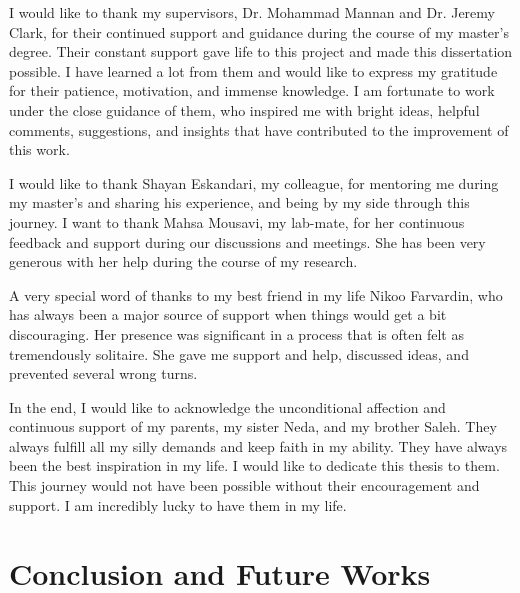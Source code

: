 \documentclass[letterpaper,12pt,onecolumn,final]{report}
\begin{document}
\begin{acknowledgments}
  I would like to thank my supervisors, Dr. Mohammad Mannan and Dr. Jeremy Clark, for their continued support and guidance during the course of my master's degree. Their constant support gave life to this project and made this dissertation possible. I have learned a lot from them and would like to express my gratitude for their patience, motivation, and immense knowledge. I am fortunate to work under the close guidance of them, who inspired me with bright ideas, helpful comments, suggestions, and insights that have contributed to the improvement of this work.

  I would like to thank Shayan Eskandari, my colleague, for mentoring me during my master's and sharing his experience, and being by my side through this journey. I want to thank Mahsa Mousavi, my lab-mate, for her continuous feedback and support during our discussions and meetings. She has been very generous with her help during the course of my research.
  
  A very special word of thanks to my best friend in my life Nikoo Farvardin, who has always been a major source of support when things would get a bit discouraging. Her presence was significant in a process that is often felt as tremendously solitaire. She gave me support and help, discussed ideas, and prevented several wrong turns.
  
  In the end, I would like to acknowledge the unconditional affection and continuous support of my parents, my sister Neda, and my brother Saleh. They always fulfill all my silly demands and keep faith in my ability. They have always been the best inspiration in my life. I would like to dedicate this thesis to them. This journey would not have been possible without their encouragement and support. I am incredibly lucky to have them in my life.
\end{acknowledgments}













\chapter{Conclusion and Future Works}
\label{chap:conclusion}
\end{document}
